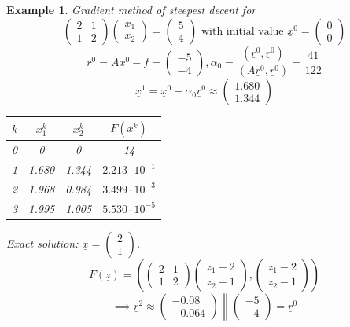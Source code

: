 \documentclass{article}
\newtheorem{example}{Example}
\begin{document}
\begin{example}
  Gradient method of steepest decent for
  \[ \begin{pmatrix} 2 & 1 \\ 1 & 2 \end{pmatrix} \begin{pmatrix} x_1 \\ x_2 \end{pmatrix} = \begin{pmatrix} 5 \\ 4 \end{pmatrix} \text{ with initial value } \underline x^0 = \begin{pmatrix} 0 \\ 0 \end{pmatrix} \]
  \[ \underline r^0 = A \underline x^0 - f = \begin{pmatrix} -5 \\ -4 \end{pmatrix}, \alpha_0 = \frac{(\underline{r}^0, \underline{r}^0)}{(A \underline{r}^0, \underline{r}^0)} = \frac{41}{122} \]
  \[ \underline x^1 = \underline x^0 - \alpha_0 \underline r^0 \approx \begin{pmatrix} 1.680 \\ 1.344 \end{pmatrix} \]
  \begin{table}
    \begin{tabular}{cccc}
      $k$ & $x_1^k$ & $x_2^k$ & $F(x^k)$ \\
    \hline
      0 & 0 & 0 & 14 \\
      1 & 1.680 & 1.344 & $2.213 \cdot 10^{-1}$ \\
      2 & 1.968 & 0.984 & $3.499 \cdot 10^{-3}$ \\
      3 & 1.995 & 1.005 & $5.530 \cdot 10^{-5}$ \\
    \end{tabular}
  \end{table}
  Exact solution: $\underline x = \begin{pmatrix} 2 \\ 1 \end{pmatrix}$.
  \[ F(\underline z) = \left(\begin{pmatrix} 2 & 1 \\ 1 & 2 \end{pmatrix} \begin{pmatrix} z_1 - 2 \\ z_2 - 1 \end{pmatrix}, \begin{pmatrix} z_1 - 2 \\ z_2 - 1 \end{pmatrix}\right) \]
  \[ \implies \underline r^2 \approx \begin{pmatrix} -0.08 \\ -0.064 \end{pmatrix} \left\| \begin{pmatrix} -5 \\ -4 \end{pmatrix} = \underline r^0\right. \]
\end{example}
\end{document}
